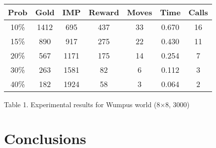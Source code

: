 \documentclass[letterpaper]{article}
\begin{document}
\small\noindent
\begin{center}

\begin{tabular}{|c|c|c|c|c|c|c|}
\hline
Prob & Gold & IMP & Reward & Moves & Time & Calls \\
\hline
10\% & 1412 & 695 & 437 & 33 & 0.670 & 16 \\
\hline
15\% & 890 & 917 & 275 & 22 & 0.430 & 11 \\
\hline
20\% & 567 & 1171 & 175 & 14 & 0.254 & 7 \\
\hline
30\% & 263 & 1581 & 82 & 6 & 0.112 & 3 \\
\hline
40\% & 182 & 1924 & 58 & 3 & 0.064 & 2 \\
\hline
\end{tabular}
Table 1. Experimental results for Wumpus world (8$\times$8, 3000)
\end{center}
\normalsize


\vspace*{-2mm}\section{Conclusions}
\end{document}
